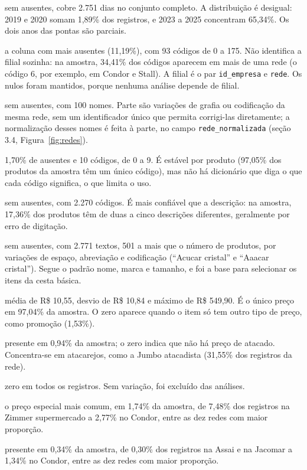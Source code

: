 \documentclass[11pt,a4paper]{article}
\newcommand{\col}[1]{\texttt{#1}}
\begin{document}
\begin{description}[style=standard, leftmargin=0pt, itemsep=4pt, font=\normalfont\bfseries]
\item[\col{data\_pesquisa}:] sem ausentes, cobre 2.751 dias no conjunto completo. A distribuição é desigual: 2019 e 2020 somam 1,89\% dos registros, e 2023 a 2025 concentram 65,34\%. Os dois anos das pontas são parciais.
\item[\col{id\_empresa}:] a coluna com mais ausentes (11,19\%), com 93 códigos de 0 a 175. Não identifica a filial sozinha: na amostra, 34,41\% dos códigos aparecem em mais de uma rede (o código 6, por exemplo, em Condor e Stall). A filial é o par \col{id\_empresa} e \col{rede}. Os nulos foram mantidos, porque nenhuma análise depende de filial.
\item[\col{rede}:] sem ausentes, com 100 nomes. Parte são variações de grafia ou codificação da mesma rede, sem um identificador único que permita corrigi-las diretamente; a normalização desses nomes é feita à parte, no campo \col{rede\_normalizada} (seção 3.4, Figura~\ref{fig:redes}).
\item[\col{codigo\_categoria}:] 1,70\% de ausentes e 10 códigos, de 0 a 9. É estável por produto (97,05\% dos produtos da amostra têm um único código), mas não há dicionário que diga o que cada código significa, o que limita o uso.
\item[\col{id\_produto}:] sem ausentes, com 2.270 códigos. É mais confiável que a descrição: na amostra, 17,36\% dos produtos têm de duas a cinco descrições diferentes, geralmente por erro de digitação.
\item[\col{descricao}:] sem ausentes, com 2.771 textos, 501 a mais que o número de produtos, por variações de espaço, abreviação e codificação (``Acucar cristal'' e ``Aaacar cristal''). Segue o padrão nome, marca e tamanho, e foi a base para selecionar os itens da cesta básica.
\item[\col{preco\_regular}:] média de R\$ 10,55, desvio de R\$ 10,84 e máximo de R\$ 549,90. É o único preço em 97,04\% da amostra. O zero aparece quando o item só tem outro tipo de preço, como promoção (1,53\%).
\item[\col{preco\_atacado}:] presente em 0,94\% da amostra; o zero indica que não há preço de atacado. Concentra-se em atacarejos, como a Jumbo atacadista (31,55\% dos registros da rede).
\item[\col{preco\_atacado\_qtd}:] zero em todos os registros. Sem variação, foi excluído das análises.
\item[\col{preco\_promocao}:] o preço especial mais comum, em 1,74\% da amostra, de 7,48\% dos registros na Zimmer supermercado a 2,77\% no Condor, entre as dez redes com maior proporção.
\item[\col{preco\_fidelidade}:] presente em 0,34\% da amostra, de 0,30\% dos registros na Assai e na Jacomar a 1,34\% no Condor, entre as dez redes com maior proporção.
\end{description}
\end{document}
